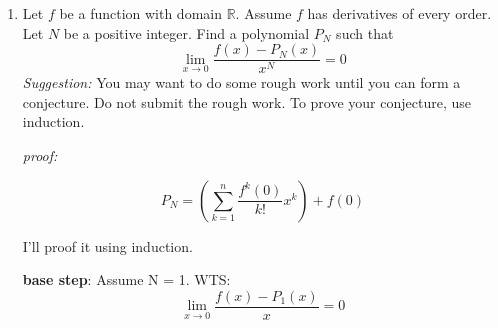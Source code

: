 \documentclass[12pt]{exam}
\newcommand {\DS} [1] {${\displaystyle #1}$}
\newcommand{\R}{\mathbb{R}}
\begin{document}
\begin{enumerate}
\begin{enumerate}





			

			

		\item  Let $f$ be a function with domain $\R$.  Assume $f$ has derivatives of every order.   Let $N$ be a positive integer.  Find a polynomial \DS{P_N} such that
			$$
				\lim_{x \to 0} \frac{f(x) - P_N(x)}{x^N} = 0
			$$
			\emph{Suggestion:} You may want to do some rough work until you can form a conjecture.    Do not submit the rough work.  To prove your conjecture, use induction.

			\emph{proof:}

			$$
			P_N = (\sum_{k = 1}^{n}\frac{f^k(0)}{k!}x^k) + f(0)
			$$

			I'll proof it using induction.

			\textbf{base step}: Assume N = 1.
			WTS:
			$$
				\lim_{x \to 0} \frac{f(x) - P_1(x)}{x} = 0
			$$


\end{enumerate}
\end{enumerate}
\end{document}
